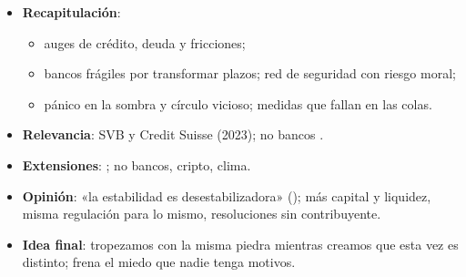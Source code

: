 \documentclass{article}
\begin{document}
\begin{columnas}
\begin{itemize}
\item \textbf{Recapitulación}:
  \begin{itemize}
  \item auges de crédito, deuda y fricciones;
  \item bancos frágiles por transformar plazos; red de seguridad con riesgo moral;
  \item pánico en la sombra y círculo vicioso; medidas que fallan en las colas.
  \end{itemize}
\item \textbf{Relevancia}: SVB y Credit Suisse (2023); no bancos .
\item \textbf{Extensiones}:     ; no bancos, cripto, clima.
\item \textbf{Opinión}: «la estabilidad es desestabilizadora» (); más capital y liquidez, misma regulación para lo mismo, resoluciones sin contribuyente.
\item \textbf{Idea final}: tropezamos con la misma piedra mientras creamos que esta vez es distinto; frena el miedo que nadie tenga motivos.
\end{itemize}


\end{columnas}
\end{document}
